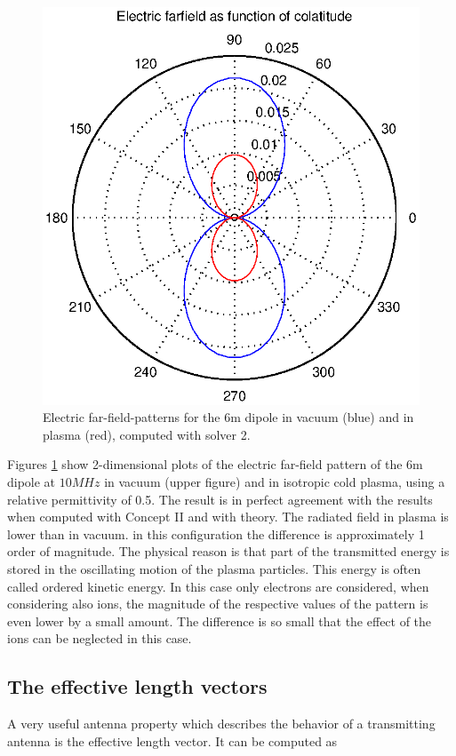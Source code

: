 \documentclass[a4paper,11pt]{article}
\begin{document}
\begin{figure}
  \includegraphics[width=12cm]{ff_10mhz.eps}
\caption{Electric far-field-patterns for the 6m dipole in vacuum (blue) and in plasma (red), computed with solver 2.}
\label{fig:patterns_vacuum}
\end{figure}

Figures \ref{fig:patterns_vacuum} show 2-dimensional plots of the electric far-field pattern of the 6m dipole at $10 MHz$ in vacuum (upper figure) and in isotropic cold plasma, using a relative permittivity of 0.5. The result is in perfect agreement with the results when computed with Concept II and with theory. The radiated field in plasma is lower than in vacuum. in this configuration the difference is approximately 1 order of magnitude. The physical reason is that part of the transmitted energy is stored in the oscillating motion of the plasma particles. This energy is often called ordered kinetic energy. In this case only electrons are considered, when considering also ions, the magnitude of the respective values of the pattern is even lower by a small amount. The difference is so small that the effect of the ions can be neglected in this case.

\subsection{The effective length vectors}
A very useful antenna property which describes the behavior of a transmitting antenna is the effective length vector. It can be computed as
\end{document}
